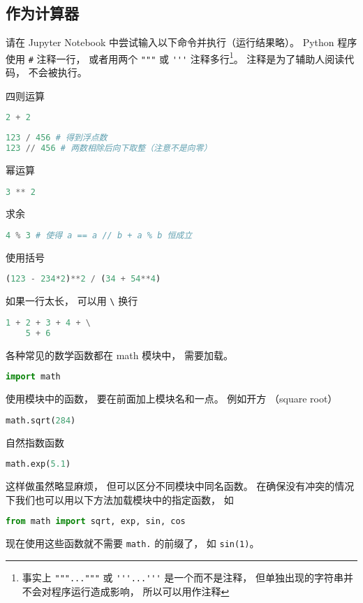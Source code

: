 

\subsection{作为计算器}
请在 Jupyter Notebook 中尝试输入以下命令并执行（运行结果略）。 Python 程序使用 \verb|#| 注释一行，  或者用两个 \verb|"""| 或 \verb|'''| 注释多行\footnote{事实上 \lstinline|"""..."""| 或 \lstinline|'''...'''| 是一个而不是注释， 但单独出现的字符串并不会对程序运行造成影响， 所以可以用作注释}。 注释是为了辅助人阅读代码， 不会被执行。

四则运算
\begin{lstlisting}[language=python]
2 + 2
\end{lstlisting}
\begin{lstlisting}[language=python]
123 / 456 # 得到浮点数
123 // 456 # 两数相除后向下取整（注意不是向零）
\end{lstlisting}
幂运算
\begin{lstlisting}[language=python]
3 ** 2
\end{lstlisting}
求余
\begin{lstlisting}[language=python]
4 % 3 # 使得 a == a // b + a % b 恒成立
\end{lstlisting}
使用括号
\begin{lstlisting}[language=python]
(123 - 234*2)**2 / (34 + 54**4)
\end{lstlisting}
如果一行太长， 可以用 \verb|\| 换行
\begin{lstlisting}[language=python]
1 + 2 + 3 + 4 + \
    5 + 6
\end{lstlisting}
各种常见的数学函数都在 math 模块中， 需要加载。
\begin{lstlisting}[language=python]
import math
\end{lstlisting}
使用模块中的函数， 要在前面加上模块名和一点。 例如开方 （square root）
\begin{lstlisting}[language=python]
math.sqrt(284)
\end{lstlisting}
自然指数函数
\begin{lstlisting}[language=python]
math.exp(5.1)
\end{lstlisting}
这样做虽然略显麻烦， 但可以区分不同模块中同名函数。 在确保没有冲突的情况下我们也可以用以下方法加载模块中的指定函数， 如
\begin{lstlisting}[language=python]
from math import sqrt, exp, sin, cos
\end{lstlisting}
现在使用这些函数就不需要 \verb|math.| 的前缀了， 如 \verb|sin(1)|。

